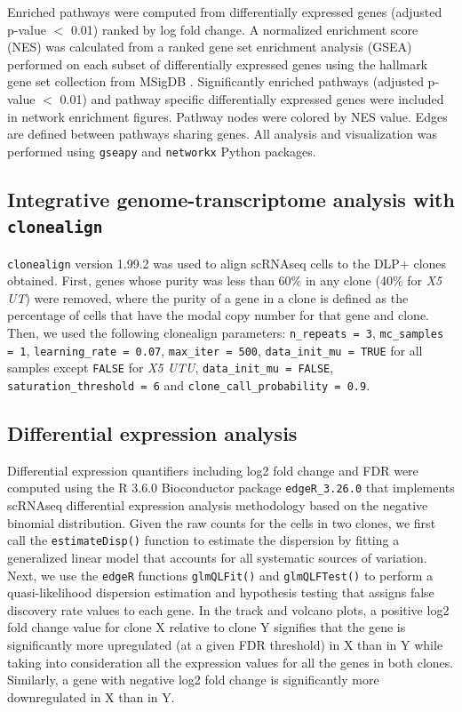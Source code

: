 Enriched pathways were computed from differentially expressed genes (adjusted p-value $<$ 0.01) ranked by log fold change.  A normalized enrichment score (NES) was calculated from a ranked gene set enrichment analysis (GSEA) \cite{shi2007gene} performed on each subset of differentially expressed genes using the hallmark gene set collection from MSigDB \cite{liberzon2015molecular}.  Significantly enriched pathways (adjusted p-value $<$ 0.01) and pathway specific differentially expressed genes were included in network enrichment figures.  
Pathway nodes were colored by NES value. Edges are defined between pathways sharing genes.
All analysis and visualization was performed using \texttt{gseapy} and \texttt{networkx} \cite{hagberg2008exploring} Python packages.

\subsection{Integrative genome-transcriptome analysis with \texttt{clonealign}}

\texttt{clonealign} version 1.99.2 was used to align scRNAseq cells to the DLP+ clones obtained. First, genes whose purity was less than 60\% in any clone (40\% for \textit{X5 UT}) were removed, where the purity of a gene in a clone  is defined as the percentage of cells that have the modal copy number for that gene and clone. Then, we used the following clonealign parameters: \texttt{n\_repeats = 3}, \texttt{mc\_samples = 1}, \texttt{learning\_rate = 0.07}, \texttt{max\_iter = 500}, \texttt{data\_init\_mu = TRUE} for all samples except \texttt{FALSE} for \textit{X5 UTU}, \texttt{data\_init\_mu = FALSE},
\texttt{saturation\_threshold = 6} and \texttt{clone\_call\_probability = 0.9}.

\subsection{Differential expression analysis}
Differential expression quantifiers including log2 fold change and FDR  were computed using the R 3.6.0 Bioconductor package \texttt{edgeR\_3.26.0} that implements scRNAseq differential expression analysis methodology based on the negative binomial distribution. Given the raw counts for the cells in two clones, we first call the \texttt{estimateDisp()} function to estimate the dispersion by fitting a generalized linear model that accounts for all systematic sources of variation. Next, we use the \texttt{edgeR} functions \texttt{glmQLFit()} and \texttt{glmQLFTest()} to perform a quasi-likelihood dispersion estimation and hypothesis testing that assigns false discovery rate values to each gene. In the track and volcano plots, a positive log2 fold change value for clone X relative to clone Y signifies that the gene is significantly more upregulated (at a given FDR threshold) in X than in Y while taking into consideration all the expression values for all the genes in both clones. Similarly, a gene with negative log2 fold change is significantly more downregulated in X than in Y. 